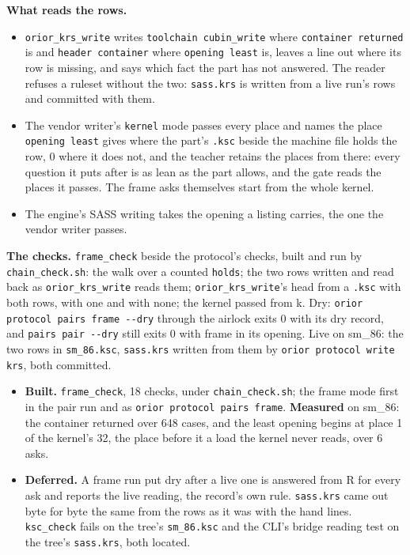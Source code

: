 \textbf{What reads the rows.}

\begin{itemize}
\item \texttt{orior\_\allowbreak{}krs\_\allowbreak{}write} writes \texttt{toolchain cubin\_\allowbreak{}write} where \texttt{container returned} is and \texttt{header container} where \texttt{opening least} is, leaves a line out where its row is missing, and says which fact the part has not answered. The reader refuses a ruleset without the two: \texttt{sass.\allowbreak{}krs} is written from a live run's rows and committed with them.
\item The vendor writer's \texttt{kernel} mode passes every place and names the place \texttt{opening least} gives where the part's \texttt{.\allowbreak{}ksc} beside the machine file holds the row, 0 where it does not, and the teacher retains the places from there: every question it puts after is as lean as the part allows, and the gate reads the places it passes. The frame asks themselves start from the whole kernel.
\item The engine's SASS writing takes the opening a listing carries, the one the vendor writer passes.
\end{itemize}

\textbf{The checks.} \texttt{frame\_\allowbreak{}check} beside the protocol's checks, built and run by \texttt{chain\_\allowbreak{}check.\allowbreak{}sh}: the walk over a counted \texttt{holds}; the two rows written and read back as \texttt{orior\_\allowbreak{}krs\_\allowbreak{}write} reads them; \texttt{orior\_\allowbreak{}krs\_\allowbreak{}write}'s head from a \texttt{.\allowbreak{}ksc} with both rows, with one and with none; the kernel passed from k. Dry: \texttt{orior protocol pairs frame -\allowbreak{}-\allowbreak{}dry} through the airlock exits 0 with its dry record, and \texttt{pairs pair -\allowbreak{}-\allowbreak{}dry} still exits 0 with frame in its opening. Live on sm\_\allowbreak{}86: the two rows in \texttt{sm\_\allowbreak{}86.\allowbreak{}ksc}, \texttt{sass.\allowbreak{}krs} written from them by \texttt{orior protocol write krs}, both committed.

\begin{itemize}
\item \textbf{Built.} \texttt{frame\_\allowbreak{}check}, 18 checks, under \texttt{chain\_\allowbreak{}check.\allowbreak{}sh}; the frame mode first in the pair run and as \texttt{orior protocol pairs frame}. \textbf{Measured} on sm\_\allowbreak{}86: the container returned over 648 cases, and the least opening begins at place 1 of the kernel's 32, the place before it a load the kernel never reads, over 6 asks.
\item \textbf{Deferred.} A frame run put dry after a live one is answered from R for every ask and reports the live reading, the record's own rule. \texttt{sass.\allowbreak{}krs} came out byte for byte the same from the rows as it was with the hand lines. \texttt{ksc\_\allowbreak{}check} fails on the tree's \texttt{sm\_\allowbreak{}86.\allowbreak{}ksc} and the CLI's bridge reading test on the tree's \texttt{sass.\allowbreak{}krs}, both located.
\end{itemize}

